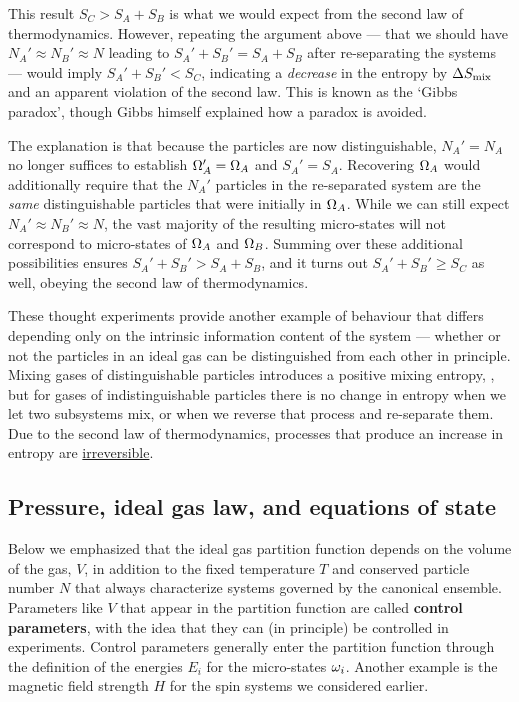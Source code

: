This result $S_C > S_A + S_B$ is what we would expect from the second law of thermodynamics.
However, repeating the argument above --- that we should have $N_A' \approx N_B' \approx N$ leading to $S_A' + S_B' = S_A + S_B$ after re-separating the systems --- would imply $S_A' + S_B' < S_C$, indicating a \textit{decrease} in the entropy by $\Delta S_{\mathrm{mix}}$ and an apparent violation of the second law.
This is known as the `Gibbs paradox', though Gibbs himself explained how a paradox is avoided. %

The explanation is that because the particles are now distinguishable, $N_A' = N_A$ no longer suffices to establish $\Omega_A' = \Omega_A$ and $S_A' = S_A$.
Recovering $\Omega_A$ would additionally require that the $N_A'$ particles in the re-separated system are the \emph{same} distinguishable particles that were initially in $\Omega_A$.
While we can still expect $N_A' \approx N_B' \approx N$, the vast majority of the resulting micro-states will not correspond to micro-states of $\Omega_A$ and $\Omega_B$.
Summing over these additional possibilities ensures $S_A' + S_B' > S_A + S_B$, and it turns out $S_A' + S_B' \geq S_C$ as well, obeying the second law of thermodynamics.

These thought experiments provide another example of behaviour that differs depending only on the intrinsic information content of the system --- whether or not the particles in an ideal gas can be distinguished from each other in principle.
Mixing gases of distinguishable particles introduces a positive mixing entropy, , but for gases of indistinguishable particles there is no change in entropy when we let two subsystems mix, or when we reverse that process and re-separate them.
Due to the second law of thermodynamics, processes that produce an increase in entropy are \href{https://en.wikipedia.org/wiki/Irreversible_process}{irreversible}.



\subsection{\label{sec:ideal_gas}Pressure, ideal gas law, and equations of state}
Below  we emphasized that the ideal gas partition function depends on the volume of the gas, $V$, in addition to the fixed temperature $T$ and conserved particle number $N$ that always characterize systems governed by the canonical ensemble.
Parameters like $V$ that appear in the partition function are called \textbf{control parameters}, with the idea that they can (in principle) be controlled in experiments.
Control parameters generally enter the partition function through the definition of the energies $E_i$ for the micro-states $\omega_i$.
Another example is the magnetic field strength $H$ for the spin systems we considered earlier.


